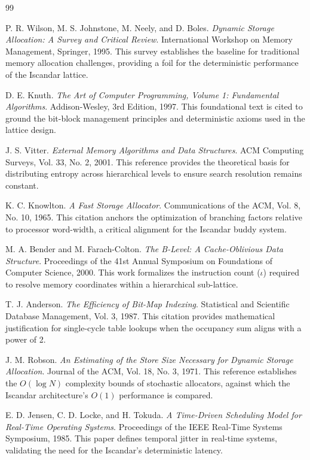 \documentclass[11pt]{article}
\begin{document}
\begin{thebibliography}{99}

 P. R. Wilson, M. S. Johnstone, M. Neely, and D. Boles. \textit{Dynamic Storage Allocation: A Survey and Critical Review}. International Workshop on Memory Management, Springer, 1995. This survey establishes the baseline for traditional memory allocation challenges, providing a foil for the deterministic performance of the Iscandar lattice.

 D. E. Knuth. \textit{The Art of Computer Programming, Volume 1: Fundamental Algorithms}. Addison-Wesley, 3rd Edition, 1997. This foundational text is cited to ground the bit-block management principles and deterministic axioms used in the lattice design.

 J. S. Vitter. \textit{External Memory Algorithms and Data Structures}. ACM Computing Surveys, Vol. 33, No. 2, 2001. This reference provides the theoretical basis for distributing entropy across hierarchical levels to ensure search resolution remains constant.

 K. C. Knowlton. \textit{A Fast Storage Allocator}. Communications of the ACM, Vol. 8, No. 10, 1965. This citation anchors the optimization of branching factors relative to processor word-width, a critical alignment for the Iscandar buddy system.

 M. A. Bender and M. Farach-Colton. \textit{The B-Level: A Cache-Oblivious Data Structure}. Proceedings of the 41st Annual Symposium on Foundations of Computer Science, 2000. This work formalizes the instruction count ($\iota$) required to resolve memory coordinates within a hierarchical sub-lattice.

 T. J. Anderson. \textit{The Efficiency of Bit-Map Indexing}. Statistical and Scientific Database Management, Vol. 3, 1987. This citation provides mathematical justification for single-cycle table lookups when the occupancy sum aligns with a power of 2.

 J. M. Robson. \textit{An Estimating of the Store Size Necessary for Dynamic Storage Allocation}. Journal of the ACM, Vol. 18, No. 3, 1971. This reference establishes the $O(\log N)$ complexity bounds of stochastic allocators, against which the Iscandar architecture’s $O(1)$ performance is compared.

 E. D. Jensen, C. D. Locke, and H. Tokuda. \textit{A Time-Driven Scheduling Model for Real-Time Operating Systems}. Proceedings of the IEEE Real-Time Systems Symposium, 1985. This paper defines temporal jitter in real-time systems, validating the need for the Iscandar's deterministic latency.


\end{thebibliography}
\end{document}
